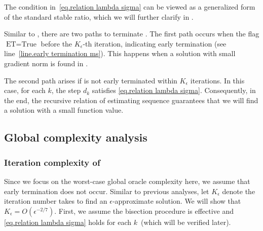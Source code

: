 \documentclass{mcom-l}
\numberwithin{equation}{section}
\begin{document}
The condition in~\eqref{eq.relation lambda sigma} can be viewed as a generalized form of the standard stable ratio, which we will further clarify in .

Similar to , there are two paths to terminate . The first path occurs when the flag $\textrm{ET} = \text{True}$ before the $K_\epsilon$-th iteration, indicating early termination (see line~\ref{line.early termination ms}). This happens when a solution with small gradient norm is found in .

The second path arises if  is not early terminated within $K_\epsilon$ iterations. In this case, for each $k$, the step $d_k$ satisfies \eqref{eq.relation lambda sigma}. Consequently, in the end, the recursive relation of estimating sequence guarantees that we will find a solution with a small function value.
\subsection{Global complexity analysis}
\subsubsection{Iteration complexity of }
Since we focus on the worst-case global oracle complexity here, we assume that early termination does not occur. Similar to previous analyses, let $K_\epsilon$ denote the iteration number  takes to find an $\epsilon$-approximate solution. We will show that $K_\epsilon = O(\epsilon^{-2/7})$. First, we assume the bisection procedure is effective and \eqref{eq.relation lambda sigma} holds for each $k$~(which will be verified later).
\end{document}
